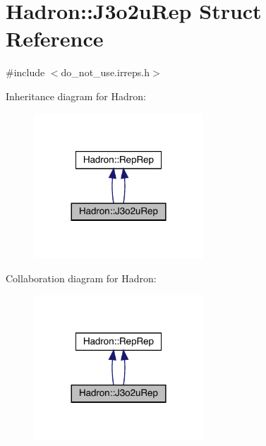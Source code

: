 \hypertarget{structHadron_1_1J3o2uRep}{}\section{Hadron\+:\+:J3o2u\+Rep Struct Reference}
\label{structHadron_1_1J3o2uRep}


{\ttfamily \#include $<$do\+\_\+not\+\_\+use.\+irreps.\+h$>$}



Inheritance diagram for Hadron\+:
\nopagebreak
\begin{figure}[H]
\begin{center}
\leavevmode
\includegraphics[width=180pt]{d5/dd1/structHadron_1_1J3o2uRep__inherit__graph}
\end{center}
\end{figure}


Collaboration diagram for Hadron\+:
\nopagebreak
\begin{figure}[H]
\begin{center}
\leavevmode
\includegraphics[width=180pt]{d7/d18/structHadron_1_1J3o2uRep__coll__graph}
\end{center}
\end{figure}
